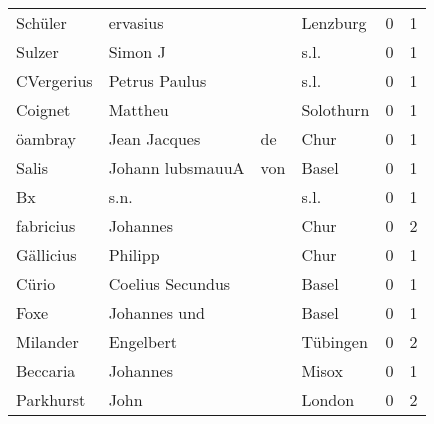 \begin{center}
\begin{tiny}
\begin{longtabu}{llllrr}
                  Schüler &                           ervasius &             &                                    Lenzburg &          0 &         1 \\
                   Sulzer &                            Simon J &             &                                        s.l. &          0 &         1 \\
               CVergerius &                      Petrus Paulus &             &                                        s.l. &          0 &         1 \\
                  Coignet &                            Mattheu &             &                                   Solothurn &          0 &         1 \\
                  öambray &                       Jean Jacques &          de &                                        Chur &          0 &         1 \\
                    Salis &                  Johann  lubsmauuA &         von &                                       Basel &          0 &         1 \\
                       Bx &                               s.n. &             &                                        s.l. &          0 &         1 \\
                fabricius &                           Johannes &             &                                        Chur &          0 &         2 \\
                Gällicius &                            Philipp &             &                                        Chur &          0 &         1 \\
                    Cürio &                   Coelius Secundus &             &                                       Basel &          0 &         1 \\
                     Foxe &                       Johannes und &             &                                       Basel &          0 &         1 \\
                 Milander &                          Engelbert &             &                                    Tübingen &          0 &         2 \\
                 Beccaria &                           Johannes &             &                                       Misox &          0 &         1 \\
                Parkhurst &                               John &             &                                      London &          0 &         2 \\

\end{longtabu}
\end{tiny}
\end{center}

